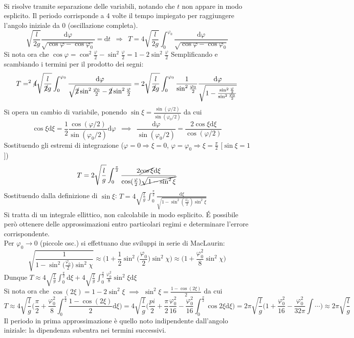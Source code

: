 \documentclass[10pt, oneside]{book}
\theoremstyle{plain}
\begin{document}
\\Si risolve tramite separazione delle variabili, notando che $t$ non appare in modo esplicito. Il periodo corrisponde a 4 volte il tempo impiegato per raggiungere l'angolo iniziale da $0$ (oscillazione completa).
\[\sqrt{\frac{l}{2g}}\frac{\textrm{d}\varphi}{\sqrt{\cos \varphi - \cos \varphi_0}} = \textrm{d}t \enspace \Rightarrow \enspace T = 4\sqrt{\frac{l}{2g}} \int_0^{\varphi_0}\frac{\textrm{d}\varphi}{\sqrt{\cos \varphi - \cos \varphi_0}}\]
Si nota ora che $\displaystyle \cos \varphi = \cos^2 \frac{\varphi}{2} - \sin^2 \frac{\varphi}{2} = 1 - 2 \sin^2 \frac{\varphi}{2}$
Semplificando e scambiando i termini per il prodotto dei segni:
\[T = ^2\cancel{4}\sqrt{\frac{l}{\cancel{2}g}} \int_0^{\varphi_0}\frac{\textrm{d}\varphi}{\sqrt{\cancel{2} \sin^2 \frac{\varphi_0}{2} - \cancel{2} \sin^2 \frac{\varphi}{2}}} = 2 \sqrt{\frac{l}{\cancel{2}g}} \int_0^{\varphi_0}\frac{1}{\sin^2 \frac{\varphi_0}{2}}\frac{\textrm{d}\varphi}{\sqrt{1 - \frac{\sin^2 \frac{\varphi}{2}}{\sin^2 \frac{\varphi_0}{2}}}}\]
Si opera un cambio di variabile, ponendo $\displaystyle \sin \xi = \frac{\sin(\varphi/2)}{\sin(\varphi_0/2)}$ da cui
\[\cos \xi \textrm{d}\xi = \frac{1}{2} \frac{\cos(\varphi/2)}{\sin(\varphi_0/2)}\textrm{d}\varphi \enspace \implies \enspace \frac{\textrm{d}\varphi}{\sin(\varphi_0/2)} = \frac{2 \cos \xi \textrm{d}\xi}{\cos(\varphi/2)}\]
Sostituendo gli estremi di integrazione ($\varphi = 0 \Rightarrow \xi = 0$, $\varphi = \varphi_0 \Rightarrow \xi = \frac{\pi}{2}$ [$\sin \xi = 1$])
\[T = 2 \sqrt{\frac{l}{g}} \int_0^{\frac{\pi}{2}}\frac{2 \cancel{\cos \xi}\textrm{d}\xi}{\cos (\frac{\varphi}{2})\cancel{\sqrt{1 - \sin^2 \xi}}}\]
Sostituendo dalla definizione di $\sin \xi$: $\displaystyle T = 4 \sqrt{\frac{l}{g}} \int_0^{\frac{\pi}{2}} \frac{\textrm{d}\xi}{\sqrt{1 - \sin^2(\frac{\varphi_0}{2}) \sin^2 \xi}}$
\\Si tratta di un integrale ellittico, non calcolabile in modo esplicito. \'E possibile però ottenere delle approssimazioni entro particolari regimi e determinare l'errore corrispondente.
\\Per $\varphi_0 \rightarrow 0$ (piccole osc.) si effettuano due sviluppi in serie di MacLaurin:
\[\sqrt{\frac{1}{1 - \sin^2\big(\frac{\varphi_0}{2}\big)\sin^2\chi}} \approx \bigg(1 + \frac{1}{2} \sin^2\big(\frac{\varphi_0}{2}\big)\sin^2\chi) \approx \bigg( 1 + \frac{\varphi_0^2}{8}\sin^2\chi\bigg)\]
Dunque $\displaystyle T \approx 4 \sqrt{\frac{l}{g}}\int_0^{\frac{\pi}{2}}\textrm{d}\xi + 4 \sqrt{\frac{l}{g}} \int_0^{\frac{\pi}{2}} \frac{\varphi_0^2}{8} \sin^2\xi\textrm{d}\xi$
\\Si nota ora che $\cos(2\xi) = 1 - 2\sin^2 \xi$ $\implies$ $\displaystyle \sin^2 \xi = \frac{1 - \cos(2\xi)}{2}$ da cui
\[T \approx 4 \sqrt{\frac{l}{g}}\bigg(\frac{\pi}{2} + \frac{\varphi_0^2}{8} \int_0^{\frac{\pi}{2}}\frac{1 - \cos(2\xi)}{2}\textrm{d}\xi\bigg) = 4 \sqrt{\frac{l}{g}} \bigg(\frac{pi}{2} + \frac{\pi}{2}\frac{\varphi_0^2}{16} - \frac{\varphi_0^2}{16}\int_0^{\frac{\pi}{2}}\cos 2 \xi \textrm{d}\xi\bigg) = 2 \pi \sqrt{\frac{l}{g}}\big(1 + \frac{\varphi_0^2}{16} - \frac{\varphi_0^2}{32\pi}\int \cdots\big) \approx 2\pi\sqrt{\frac{l}{g}}\]
Il periodo in prima approssimazione è quello noto indipendente dall'angolo iniziale: la dipendenza subentra nei termini successivi.
\end{document}
